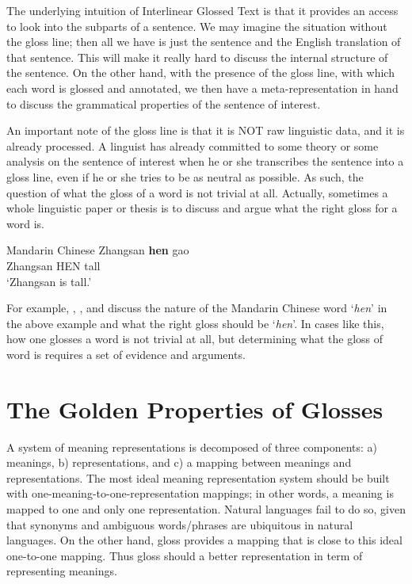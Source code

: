 \documentclass[final]{ua-thesis}
\numberwithin{equation}{section}
\begin{document}
The underlying intuition of Interlinear Glossed Text is that it provides an access to look into the subparts of a sentence. We may imagine the situation without the gloss line; then all we have is just the sentence and the English translation of that sentence. This will make it really hard to discuss the internal structure of the sentence. On the other hand, with the presence of the gloss line, with which each word is glossed and annotated, we then have a meta-representation in hand to discuss the grammatical properties of the sentence of interest.  
 
An important note of the gloss line is that it is NOT raw linguistic data, and it is already processed. A linguist has already committed to some theory or some analysis on the sentence of interest when he or she transcribes the sentence into a gloss line, even if he or she tries to be as neutral as possible. As such, the question of what the gloss of a word is not trivial at all. Actually, sometimes a whole linguistic paper or thesis is to discuss and argue what the right gloss for a word is.  

\begin{exe}  
\ex Mandarin Chinese
	\gll   Zhangsan \textbf{hen} gao\\
     	   Zhangsan HEN tall\\
    \glt   `Zhangsan is tall.'  
\end{exe}  

For example, \citet{grano2008mandarin}, \citet{Chen2010}, and \citet{liu2010positive} discuss the nature of the Mandarin Chinese word `\textit{hen}' in the above example and what the right gloss should be `\textit{hen}'. In cases like this, how one glosses a word is not trivial at all, but determining what the gloss of word is requires a set of evidence and arguments. 

\section{The Golden Properties of Glosses}

A system of meaning representations is decomposed of three components: a) meanings, b) representations, and c) a mapping between meanings and representations. The most ideal meaning representation system should be built with one-meaning-to-one-representation mappings; in other words, a meaning is mapped to one and only one representation. Natural languages fail to do so, given that synonyms and ambiguous words/phrases are ubiquitous in natural languages. On the other hand, gloss provides a mapping that is close to this ideal one-to-one mapping. Thus gloss should a better representation in term of representing meanings. 
\end{document}
